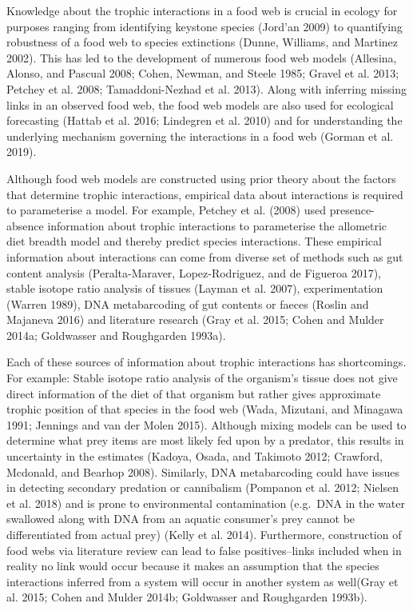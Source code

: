 \documentclass{article}
\begin{document}
Knowledge about the trophic interactions in a food web is crucial in
ecology for purposes ranging from identifying keystone species (Jord'an
2009) to quantifying robustness of a food web to species extinctions
(Dunne, Williams, and Martinez 2002). This has led to the development of
numerous food web models (Allesina, Alonso, and Pascual 2008; Cohen,
Newman, and Steele 1985; Gravel et al. 2013; Petchey et al. 2008;
Tamaddoni-Nezhad et al. 2013). Along with inferring missing links in an
observed food web, the food web models are also used for ecological
forecasting (Hattab et al. 2016; Lindegren et al. 2010) and for
understanding the underlying mechanism governing the interactions in a
food web (Gorman et al. 2019).

Although food web models are constructed using prior theory about the
factors that determine trophic interactions, empirical data about
interactions is required to parameterise a model. For example, Petchey
et al. (2008) used presence-absence information about trophic
interactions to parameterise the allometric diet breadth model and
thereby predict species interactions. These empirical information about
interactions can come from diverse set of methods such as gut content
analysis (Peralta-Maraver, Lopez-Rodriguez, and de Figueroa 2017),
stable isotope ratio analysis of tissues (Layman et al. 2007),
experimentation (Warren 1989), DNA metabarcoding of gut contents or
faeces (Roslin and Majaneva 2016) and literature research (Gray et al.
2015; Cohen and Mulder 2014a; Goldwasser and Roughgarden 1993a).

Each of these sources of information about trophic interactions has
shortcomings. For example: Stable isotope ratio analysis of the
organism's tissue does not give direct information of the diet of that
organism but rather gives approximate trophic position of that species
in the food web (Wada, Mizutani, and Minagawa 1991; Jennings and van der
Molen 2015). Although mixing models can be used to determine what prey
items are most likely fed upon by a predator, this results in
uncertainty in the estimates (Kadoya, Osada, and Takimoto 2012;
Crawford, Mcdonald, and Bearhop 2008). Similarly, DNA metabarcoding
could have issues in detecting secondary predation or cannibalism
(Pompanon et al. 2012; Nielsen et al. 2018) and is prone to
environmental contamination (e.g.~DNA in the water swallowed along with
DNA from an aquatic consumer's prey cannot be differentiated from actual
prey) (Kelly et al. 2014). Furthermore, construction of food webs via
literature review can lead to false positives--links included when in
reality no link would occur because it makes an assumption that the
species interactions inferred from a system will occur in another system
as well(Gray et al. 2015; Cohen and Mulder 2014b; Goldwasser and
Roughgarden 1993b).
\end{document}
